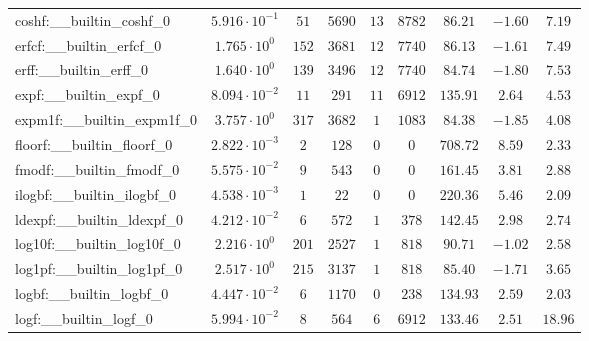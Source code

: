 \begin{tabular}{|l|c|c|c|c|c|c|c|c|}
coshf:\_\_builtin\_coshf\_0               & $ 5.916 \cdot 10^{-1} $ & $ 51     $ & $ 5690  $ & $ 13  $ & $ 8782   $ & $ 86.21       $ & $ -1.60   $ & $ 7.19    $ \\
erfcf:\_\_builtin\_erfcf\_0               & $ 1.765 \cdot 10^{0}  $ & $ 152    $ & $ 3681  $ & $ 12  $ & $ 7740   $ & $ 86.13       $ & $ -1.61   $ & $ 7.49    $ \\
erff:\_\_builtin\_erff\_0                 & $ 1.640 \cdot 10^{0}  $ & $ 139    $ & $ 3496  $ & $ 12  $ & $ 7740   $ & $ 84.74       $ & $ -1.80   $ & $ 7.53    $ \\
expf:\_\_builtin\_expf\_0                 & $ 8.094 \cdot 10^{-2} $ & $ 11     $ & $ 291   $ & $ 11  $ & $ 6912   $ & $ 135.91      $ & $ 2.64    $ & $ 4.53    $ \\
expm1f:\_\_builtin\_expm1f\_0             & $ 3.757 \cdot 10^{0}  $ & $ 317    $ & $ 3682  $ & $ 1   $ & $ 1083   $ & $ 84.38       $ & $ -1.85   $ & $ 4.08    $ \\
floorf:\_\_builtin\_floorf\_0             & $ 2.822 \cdot 10^{-3} $ & $ 2      $ & $ 128   $ & $ 0   $ & $ 0      $ & $ 708.72      $ & $ 8.59    $ & $ 2.33    $ \\
fmodf:\_\_builtin\_fmodf\_0               & $ 5.575 \cdot 10^{-2} $ & $ 9      $ & $ 543   $ & $ 0   $ & $ 0      $ & $ 161.45      $ & $ 3.81    $ & $ 2.88    $ \\
ilogbf:\_\_builtin\_ilogbf\_0             & $ 4.538 \cdot 10^{-3} $ & $ 1      $ & $ 22    $ & $ 0   $ & $ 0      $ & $ 220.36      $ & $ 5.46    $ & $ 2.09    $ \\
ldexpf:\_\_builtin\_ldexpf\_0             & $ 4.212 \cdot 10^{-2} $ & $ 6      $ & $ 572   $ & $ 1   $ & $ 378    $ & $ 142.45      $ & $ 2.98    $ & $ 2.74    $ \\
log10f:\_\_builtin\_log10f\_0             & $ 2.216 \cdot 10^{0}  $ & $ 201    $ & $ 2527  $ & $ 1   $ & $ 818    $ & $ 90.71       $ & $ -1.02   $ & $ 2.58    $ \\
log1pf:\_\_builtin\_log1pf\_0             & $ 2.517 \cdot 10^{0}  $ & $ 215    $ & $ 3137  $ & $ 1   $ & $ 818    $ & $ 85.40       $ & $ -1.71   $ & $ 3.65    $ \\
logbf:\_\_builtin\_logbf\_0               & $ 4.447 \cdot 10^{-2} $ & $ 6      $ & $ 1170  $ & $ 0   $ & $ 238    $ & $ 134.93      $ & $ 2.59    $ & $ 2.03    $ \\
logf:\_\_builtin\_logf\_0                 & $ 5.994 \cdot 10^{-2} $ & $ 8      $ & $ 564   $ & $ 6   $ & $ 6912   $ & $ 133.46      $ & $ 2.51    $ & $ 18.96   $ \\

\end{tabular}
